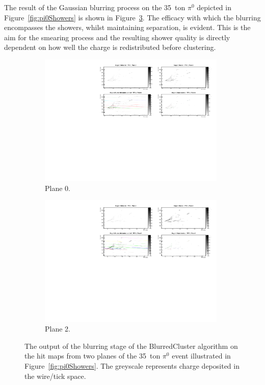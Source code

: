 The result of the Gaussian blurring process on the 35~ton $\pi^0$ depicted in Figure~\ref{fig:pi0Showers} is shown in Figure~\ref{fig:pi0ShowersBlurredMap}.  The efficacy with which the blurring encompasses the showers, whilst maintaining separation, is evident.  This is the aim for the smearing process and the resulting shower quality is directly dependent on how well the charge is redistributed before clustering.

\begin{figure}
  \centering
  \begin{subfigure}[t]{0.48\linewidth}
    \centering
    \includegraphics[width=0.98\textwidth]{EVDPi0BlurPlane0.pdf}
    \caption{Plane 0.}
    \label{fig:pi0ShowerBlurredMapPlane0}
  \end{subfigure}
  \hfill
  \begin{subfigure}[t]{0.48\linewidth}
    \centering
    \includegraphics[width=0.98\textwidth]{EVDPi0BlurPlane2.pdf}
    \caption{Plane 2.}
    \label{fig:pi0ShowerBlurredMapPlane2}
  \end{subfigure}
  \caption[The output of the blurring stage of the BlurredCluster algorithm on the hit maps from two planes of the 35~ton $\pi^0$ event illustrated in Figure~\ref{fig:pi0Showers}.]{The output of the blurring stage of the BlurredCluster algorithm on the hit maps from two planes of the 35~ton $\pi^0$ event illustrated in Figure~\ref{fig:pi0Showers}.  The greyscale represents charge deposited in the wire/tick space.}
  \label{fig:pi0ShowersBlurredMap}
\end{figure}

